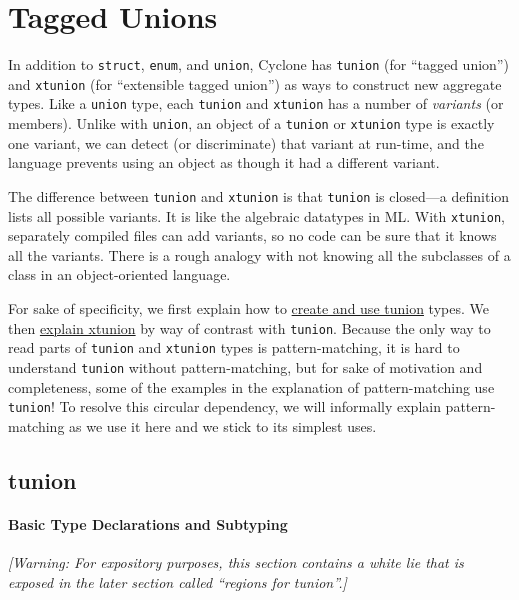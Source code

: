 \section{Tagged Unions}
\label{sec:taggedunions}

In addition to \texttt{struct}, \texttt{enum}, and \texttt{union}, Cyclone
has \texttt{tunion} (for ``tagged union'') and \texttt{xtunion} (for
``extensible tagged union'') as ways to construct new aggregate types.
Like a \texttt{union} type, each \texttt{tunion} and \texttt{xtunion} has a
number of \textit{variants} (or members).  Unlike with \texttt{union},
an object of a \texttt{tunion} or \texttt{xtunion} type is exactly one
variant, we can detect (or discriminate) that variant at run-time, and
the language prevents using an object as though it had a different
variant.

The difference between \texttt{tunion} and \texttt{xtunion} is that
\texttt{tunion} is closed---a definition lists all possible variants.
It is like the algebraic datatypes in ML\@. With \texttt{xtunion},
separately compiled files can add variants, so no code can be sure
that it knows all the variants.  There is a rough analogy with not
knowing all the subclasses of a class in an object-oriented language.

For sake of specificity, we first explain how to
\hyperlink{tunion_sec}{create and use tunion} types.  We then
\hyperlink{xtunion_sec}{explain xtunion} by way of contrast with
\texttt{tunion}.  Because the only way to read parts of \texttt{tunion}
and \texttt{xtunion} types is pattern-matching, it is hard to understand
\texttt{tunion} without pattern-matching, but for sake of motivation and
completeness, some of the examples in the explanation of
pattern-matching use \texttt{tunion}!  To resolve this circular
dependency, we will informally explain pattern-matching as we use it
here and we stick to its simplest uses.

\subsection{tunion}\hypertarget{tunion_sec}{}

\paragraph{Basic Type Declarations and Subtyping}
\textit{[Warning: For expository purposes, this section contains a
  white lie that is exposed in the later section called ``regions for
  tunion''.]}

